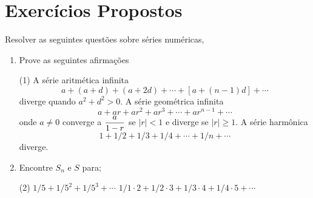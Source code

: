 \section*{Exercícios Propostos}
Resolver as seguintes quest\~{o}es sobre s\'{e}ries num\'{e}ricas,
\begin{enumerate}[label=\rm{(\arabic*)}]
\item Prove as seguintes afirmações
\begin{tasks}[label=(\alph*),item-indent=6em,label-width=4ex,ref=(\alph*)](1)
\task  A s\'erie aritm\'etica infinita
\begin{equation*}
  a+(a+d)+(a+2d)+\cdots+[a+(n-1)d]+\cdots
\end{equation*}
diverge quando $a^2+d^2>0$.
\task A s\'erie geom\'etrica infinita
\begin{equation*}
  a+ar+ar^2+ar^3+\cdots+ar^{n-1}+\cdots
\end{equation*}
onde $a\not=0$ converge a $\displaystyle{\frac{a}{1-r}}$ se $|r|<1$ e diverge se $|r|\geq 1$.
\task  A série harmônica
\begin{equation*}
  1+1/2+1/3+1/4+\cdots+1/n+\cdots
\end{equation*}
diverge.
\end{tasks}
\item Encontre $S_{n}$ e $S$ para;
\begin{tasks}[label=(\alph*),item-indent=6em,label-width=4ex,ref=(\alph*)](2)
\task  \(1/5+1/5^2+1/5^3+\cdots \)
\task \(1/1\cdot2+1/2\cdot3+1/3\cdot4+1/4\cdot5+\cdots\)
\end{tasks}


\end{enumerate}
